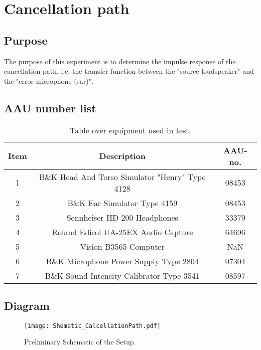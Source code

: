 \section{Cancellation path}
\subsection{Purpose}
The purpose of this experiment is to determine the impulse response of the cancellation path, i.e. the transfer-function between the "source-loudspeaker" and the "error-microphone (ear)".
		
\subsection{AAU number list}
\begin{table}[h]
	\centering
	\begin{tabular}{ c c c } \toprule
		{Item}	& {Description} 						& {AAU-no}. \\ \bottomrule 
		1	&	B\&K Head And Torso Simulator "Henry" Type 4128	& 08453		\\
		2	&	B\&K Ear Simulator Type 4159			& 08453		\\
		3	&	Sennheiser HD 200	Headphones			& 33379		\\
		4	&	Roland Edirol UA-25EX Audio Capture		& 64696		\\
		5	&	Vision B3565 Computer					& NaN		\\
		6	&	B\&K Microphone Power Supply Type 2804	& 07304		\\
		7	&	B\&K Sound Intensity Calibrator Type 3541	& 08597	\\ \bottomrule
	\end{tabular}
	\caption{Table over equipment used in test.}
	\label{tab:UsedEquipmentListningCP}
\end{table}

\subsection{Diagram}
\begin{figure}[H]
	\centering
	\texttt{[image: Shematic\_CalcellationPath.pdf]}
	\caption{Preliminary Schematic of the Setup.}
	\label{Schematic}
\end{figure}

